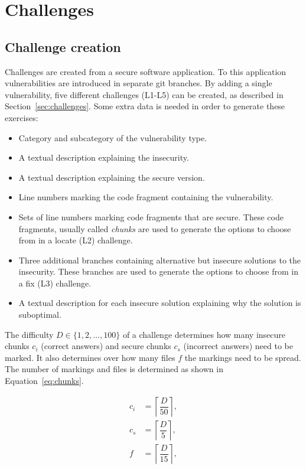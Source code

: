 \chapter{Challenges}
\label{app:challenges}

\section{Challenge creation}
\label{sec:challenge-creation}
Challenges are created from a secure software application. To this application vulnerabilities are introduced in separate git branches. By adding a single vulnerability, five different challenges (L1-L5) can be created, as described in Section~\ref{sec:challenges}. Some extra data is needed in order to generate these exercises:
\begin{itemize}
\setlength\itemsep{0em}
    \item Category and subcategory of the vulnerability type.
    \item A textual description explaining the insecurity.
    \item A textual description explaining the secure version.
    \item Line numbers marking the code fragment containing the vulnerability.
    \item Sets of line numbers marking code fragments that are secure. These code fragments, usually called \textit{chunks} are used to generate the options to choose from in a locate (L2) challenge.
    \item Three additional branches containing alternative but insecure solutions to the insecurity. These branches are used to generate the options to choose from in a fix (L3) challenge.
    \item A textual description for each insecure solution explaining why the solution is suboptimal.
\end{itemize}

The difficulty $D \in \{1,2,\dots,100\}$ of a challenge determines how many insecure chunks $c_i$ (correct answers) and secure chunks $c_s$ (incorrect answers) need to be marked. It also determines over how many files $f$ the markings need to be spread. The number of markings and files is determined as shown in Equation~\ref{eq:chunks}.

\begin{subequations}
\label{eq:chunks}
\begin{align}
        c_i &= \left\lceil \dfrac{D}{50} \right\rceil ,         \label{eq:number-of-insecure-chunks} \\
        c_s &= \left\lceil \dfrac{D}{5} \right\rceil ,         \label{eq:number-of-secure-chunks} \\
        f &= \left\lceil \dfrac{D}{15} \right\rceil ,         \label{eq:number-of-files}
\end{align}
\end{subequations}


